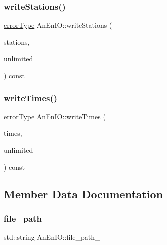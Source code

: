 \mbox{\label{class_an_en_i_o_ac4cb6e66c0661eff0a10dcc3cb3324e8}} 
\subsubsection{\texorpdfstring{write\+Stations()}{writeStations()}}
{\footnotesize\ttfamily \mbox{\hyperlink{class_an_en_i_o_aa56bc1ec6610b86db4349bce20f9ead0}{error\+Type}} An\+En\+I\+O\+::write\+Stations (\begin{DoxyParamCaption}\item[{const \mbox{\hyperlink{classanen_sta_1_1_stations}{anen\+Sta\+::\+Stations}} \&}]{stations,  }\item[{bool}]{unlimited }\end{DoxyParamCaption}) const}

\mbox{\label{class_an_en_i_o_a13ba268b1cae107c145ad8ed895ddedd}} 
\subsubsection{\texorpdfstring{write\+Times()}{writeTimes()}}
{\footnotesize\ttfamily \mbox{\hyperlink{class_an_en_i_o_aa56bc1ec6610b86db4349bce20f9ead0}{error\+Type}} An\+En\+I\+O\+::write\+Times (\begin{DoxyParamCaption}\item[{const \mbox{\hyperlink{classanen_time_1_1_times}{anen\+Time\+::\+Times}} \&}]{times,  }\item[{bool}]{unlimited }\end{DoxyParamCaption}) const}



\subsection{Member Data Documentation}
\mbox{\label{class_an_en_i_o_ab892e06ca18be5e0c442c9e882e4475f}} 
\subsubsection{\texorpdfstring{file\+\_\+path\+\_\+}{file\_path\_}}
{\footnotesize\ttfamily std\+::string An\+En\+I\+O\+::file\+\_\+path\+\_\+\hspace{0.3cm}{\ttfamily [protected]}}

